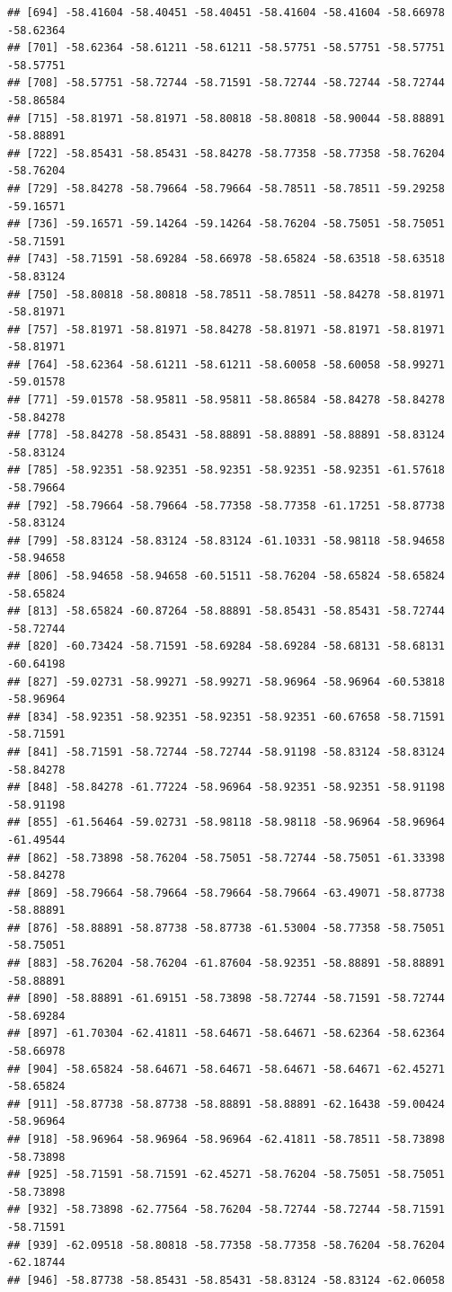\documentclass[
]{article}
\begin{document}
\begin{verbatim}
## [694] -58.41604 -58.40451 -58.40451 -58.41604 -58.41604 -58.66978 -58.62364
## [701] -58.62364 -58.61211 -58.61211 -58.57751 -58.57751 -58.57751 -58.57751
## [708] -58.57751 -58.72744 -58.71591 -58.72744 -58.72744 -58.72744 -58.86584
## [715] -58.81971 -58.81971 -58.80818 -58.80818 -58.90044 -58.88891 -58.88891
## [722] -58.85431 -58.85431 -58.84278 -58.77358 -58.77358 -58.76204 -58.76204
## [729] -58.84278 -58.79664 -58.79664 -58.78511 -58.78511 -59.29258 -59.16571
## [736] -59.16571 -59.14264 -59.14264 -58.76204 -58.75051 -58.75051 -58.71591
## [743] -58.71591 -58.69284 -58.66978 -58.65824 -58.63518 -58.63518 -58.83124
## [750] -58.80818 -58.80818 -58.78511 -58.78511 -58.84278 -58.81971 -58.81971
## [757] -58.81971 -58.81971 -58.84278 -58.81971 -58.81971 -58.81971 -58.81971
## [764] -58.62364 -58.61211 -58.61211 -58.60058 -58.60058 -58.99271 -59.01578
## [771] -59.01578 -58.95811 -58.95811 -58.86584 -58.84278 -58.84278 -58.84278
## [778] -58.84278 -58.85431 -58.88891 -58.88891 -58.88891 -58.83124 -58.83124
## [785] -58.92351 -58.92351 -58.92351 -58.92351 -58.92351 -61.57618 -58.79664
## [792] -58.79664 -58.79664 -58.77358 -58.77358 -61.17251 -58.87738 -58.83124
## [799] -58.83124 -58.83124 -58.83124 -61.10331 -58.98118 -58.94658 -58.94658
## [806] -58.94658 -58.94658 -60.51511 -58.76204 -58.65824 -58.65824 -58.65824
## [813] -58.65824 -60.87264 -58.88891 -58.85431 -58.85431 -58.72744 -58.72744
## [820] -60.73424 -58.71591 -58.69284 -58.69284 -58.68131 -58.68131 -60.64198
## [827] -59.02731 -58.99271 -58.99271 -58.96964 -58.96964 -60.53818 -58.96964
## [834] -58.92351 -58.92351 -58.92351 -58.92351 -60.67658 -58.71591 -58.71591
## [841] -58.71591 -58.72744 -58.72744 -58.91198 -58.83124 -58.83124 -58.84278
## [848] -58.84278 -61.77224 -58.96964 -58.92351 -58.92351 -58.91198 -58.91198
## [855] -61.56464 -59.02731 -58.98118 -58.98118 -58.96964 -58.96964 -61.49544
## [862] -58.73898 -58.76204 -58.75051 -58.72744 -58.75051 -61.33398 -58.84278
## [869] -58.79664 -58.79664 -58.79664 -58.79664 -63.49071 -58.87738 -58.88891
## [876] -58.88891 -58.87738 -58.87738 -61.53004 -58.77358 -58.75051 -58.75051
## [883] -58.76204 -58.76204 -61.87604 -58.92351 -58.88891 -58.88891 -58.88891
## [890] -58.88891 -61.69151 -58.73898 -58.72744 -58.71591 -58.72744 -58.69284
## [897] -61.70304 -62.41811 -58.64671 -58.64671 -58.62364 -58.62364 -58.66978
## [904] -58.65824 -58.64671 -58.64671 -58.64671 -58.64671 -62.45271 -58.65824
## [911] -58.87738 -58.87738 -58.88891 -58.88891 -62.16438 -59.00424 -58.96964
## [918] -58.96964 -58.96964 -58.96964 -62.41811 -58.78511 -58.73898 -58.73898
## [925] -58.71591 -58.71591 -62.45271 -58.76204 -58.75051 -58.75051 -58.73898
## [932] -58.73898 -62.77564 -58.76204 -58.72744 -58.72744 -58.71591 -58.71591
## [939] -62.09518 -58.80818 -58.77358 -58.77358 -58.76204 -58.76204 -62.18744
## [946] -58.87738 -58.85431 -58.85431 -58.83124 -58.83124 -62.06058
\end{verbatim}
\end{document}
